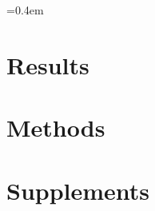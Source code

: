 \documentclass[a4paper, twocolumn]{article}
\begin{document}

\font=0.4em  %
\twocolumn


\section*{Results}



\section*{Methods}




\clearpage
\section*{Supplements}

\end{document}
